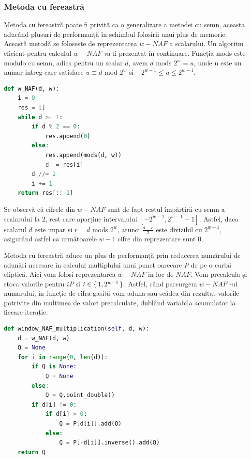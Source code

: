 \subsubsection{Metoda cu fereastră}

Metoda cu fereastră poate fi privită ca o generalizare a metodei cu semn, aceasta aducând plusuri de performanță în schimbul folosirii unui plus de memorie. Această metodă se folosește de reprezentarea $w-NAF$ a scalarului.
Un algoritm eficient pentru calculul $w-NAF$ va fi prezentat în continuare. Funcția mods este modulo cu semn, adica pentru un scalar $d$, avem $d$ mods $2^w=u$, unde u este un numar intreg care satisface $u\equiv d$ mod $2^w$ si $-2^{w-1}\leq u\leq 2^{w-1}$.

\begin{lstlisting}[language=Python]
def w_NAF(d, w):
    i = 0
    res = []
    while d >= 1:
        if d % 2 == 0:
            res.append(0)
        else:
            res.append(mods(d, w))
            d -= res[i]
        d //= 2
        i += 1
    return res[::-1]
\end{lstlisting}

Se observă că cifrele din $w-NAF$ sunt de fapt restul împărțirii cu semn a scalarului la $2$, rest care aparține intervalului $[-2^{w-1}, 2^{w-1}-1]$. Astfel, daca scalarul $d$ este impar și $r = d$ mods $2^w$, atunci $\frac{d-r}{2}$ este divizibil cu $2^{w-1}$, asigurând astfel ca următoarele $w-1$ cifre din reprezentare sunt $0$.
 
Metoda cu fereastră aduce un plus de performanță prin reducerea numărului de adunări necesare în calculul multiplului unui punct oarecare $P$ de pe o curbă eliptică. Aici vom folosi reprezentarea $w-NAF$ in loc de $NAF$. Vom precalcula și stoca valorile pentru $iP$ si $i\in\set{1, 2^{w-1}}$. Astfel, când parcurgem $w-NAF$ -ul numarului, în funcție de cifra gasită vom aduna sau scădea din rezultat valorile potrivite din multimea de valori precalculate, dublând variabila acumulator la fiecare iterație.

\begin{lstlisting}[language=Python]
def window_NAF_multiplication(self, d, w):
    d = w_NAF(d, w)
    Q = None
    for i in range(0, len(d)):
        if Q is None:
            Q = None
        else:
            Q = Q.point_double()
        if d[i] != 0:
            if d[i] > 0:
                Q = P[d[i]].add(Q)
            else:
                Q = P[-d[i]].inverse().add(Q)
    return Q
\end{lstlisting}

